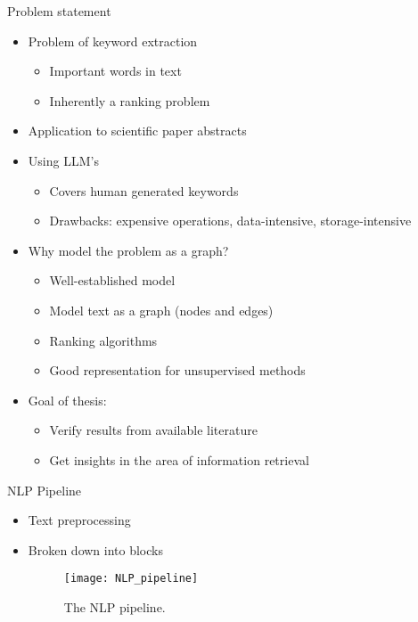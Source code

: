 \documentclass[t]{beamer}
\begin{document}
	
	\begin{frame}{Problem statement}
		\begin{itemize}
			\item Problem of keyword extraction 
			\begin{itemize}
				\item Important words in text
				\item Inherently a ranking problem
			\end{itemize}
			\item Application to scientific paper abstracts
			\item Using LLM's
			\begin{itemize}
				\item Covers human generated keywords
				\item Drawbacks: expensive operations, data-intensive, storage-intensive
			\end{itemize}
			\item Why model the problem as a graph?
			\begin{itemize}
				\item Well-established model
				\item Model text as a graph (nodes and edges)
				\item Ranking algorithms
				\item Good representation for unsupervised methods
			\end{itemize}
			
			\item Goal of thesis:
			\begin{itemize}
				\item Verify results from available literature
				\item Get insights in the area of information retrieval
			\end{itemize}
		\end{itemize}
	\end{frame}

	\begin{frame}{NLP Pipeline}
		\begin{itemize}
			\item Text preprocessing
			\item Broken down into blocks
			\begin{figure}[H]
				\centering
				\texttt{[image: NLP\_pipeline]}		
				\caption{The NLP pipeline.}
				\label{NLP_pipeline_label}
			\end{figure}
		\end{itemize}
	\end{frame}
\end{document}
